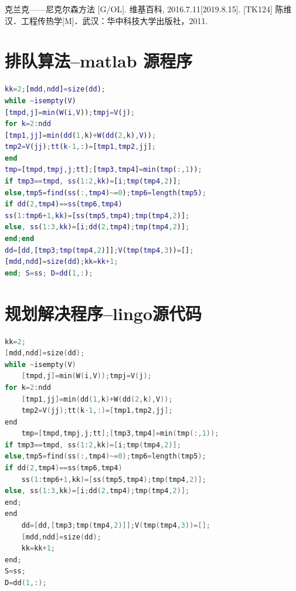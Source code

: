 \documentclass{cumcmthesis}
\begin{document}
\begin{thebibliography}{9}%
  克兰克——尼克尔森方法 [G/OL]. 维基百科, 2016.7.11[2019.8.15].
  [TK124] 陈维汉．工程传热学[M]．武汉：华中科技大学出版社，2011.
\end{thebibliography}

\newpage
\begin{appendices}
\section{排队算法--matlab 源程序}
\begin{lstlisting}[language=matlab]
kk=2;[mdd,ndd]=size(dd);
while ~isempty(V)
[tmpd,j]=min(W(i,V));tmpj=V(j);
for k=2:ndd
[tmp1,jj]=min(dd(1,k)+W(dd(2,k),V));
tmp2=V(jj);tt(k-1,:)=[tmp1,tmp2,jj];
end
tmp=[tmpd,tmpj,j;tt];[tmp3,tmp4]=min(tmp(:,1));
if tmp3==tmpd, ss(1:2,kk)=[i;tmp(tmp4,2)];
else,tmp5=find(ss(:,tmp4)~=0);tmp6=length(tmp5);
if dd(2,tmp4)==ss(tmp6,tmp4)
ss(1:tmp6+1,kk)=[ss(tmp5,tmp4);tmp(tmp4,2)];
else, ss(1:3,kk)=[i;dd(2,tmp4);tmp(tmp4,2)];
end;end
dd=[dd,[tmp3;tmp(tmp4,2)]];V(tmp(tmp4,3))=[];
[mdd,ndd]=size(dd);kk=kk+1;
end; S=ss; D=dd(1,:);
 \end{lstlisting}
 \section{规划解决程序--lingo源代码}
\begin{lstlisting}[language=c]
kk=2;
[mdd,ndd]=size(dd);
while ~isempty(V)
    [tmpd,j]=min(W(i,V));tmpj=V(j);
for k=2:ndd
    [tmp1,jj]=min(dd(1,k)+W(dd(2,k),V));
    tmp2=V(jj);tt(k-1,:)=[tmp1,tmp2,jj];
end
    tmp=[tmpd,tmpj,j;tt];[tmp3,tmp4]=min(tmp(:,1));
if tmp3==tmpd, ss(1:2,kk)=[i;tmp(tmp4,2)];
else,tmp5=find(ss(:,tmp4)~=0);tmp6=length(tmp5);
if dd(2,tmp4)==ss(tmp6,tmp4)
    ss(1:tmp6+1,kk)=[ss(tmp5,tmp4);tmp(tmp4,2)];
else, ss(1:3,kk)=[i;dd(2,tmp4);tmp(tmp4,2)];
end;
end
    dd=[dd,[tmp3;tmp(tmp4,2)]];V(tmp(tmp4,3))=[];
    [mdd,ndd]=size(dd);
    kk=kk+1;
end;
S=ss;
D=dd(1,:);
 \end{lstlisting}
\end{appendices}
\end{document}

